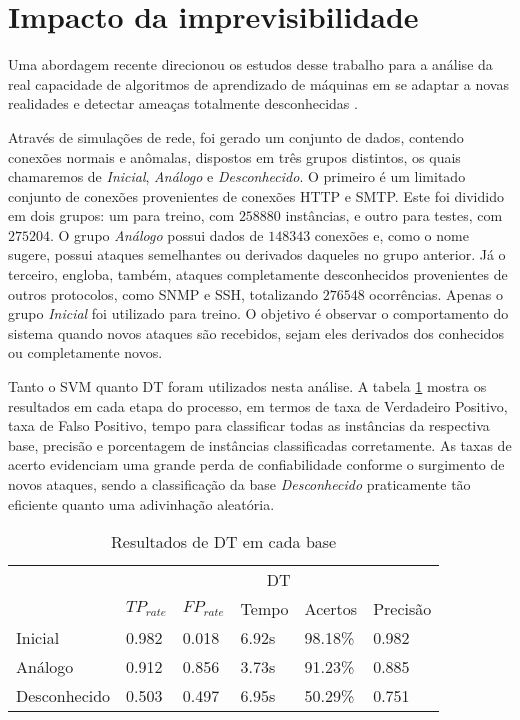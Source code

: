 \section{Impacto da imprevisibilidade}
Uma abordagem recente direcionou os estudos desse trabalho para a análise da real capacidade de algoritmos de
aprendizado de máquinas em se adaptar a novas realidades e detectar ameaças totalmente desconhecidas \cite{sommer10}.
\par Através de simulações de rede, foi gerado um conjunto de dados, contendo conexões normais e anômalas,
dispostos em três grupos distintos, os quais chamaremos de \textit{Inicial}, \textit{Análogo} e \textit{Desconhecido}.
O primeiro é um limitado conjunto de conexões provenientes de conexões HTTP e SMTP. Este foi dividido em dois grupos:
um para treino, com $258880$ instâncias, e outro para testes, com $275204$. O grupo \textit{Análogo} possui dados de
$148343$ conexões e, como o nome sugere, possui ataques semelhantes ou derivados daqueles no grupo anterior.
Já o terceiro, engloba, também, ataques completamente desconhecidos provenientes de outros
protocolos, como SNMP e SSH, totalizando $276548$ ocorrências. Apenas o grupo \textit{Inicial} foi utilizado para
treino. O objetivo é observar o comportamento do sistema quando novos
ataques são recebidos, sejam eles derivados dos conhecidos ou completamente novos.
\par Tanto o SVM quanto DT foram utilizados nesta análise. A tabela \ref{tab:dt} mostra os resultados
em cada etapa do processo, em termos de taxa de Verdadeiro Positivo, taxa de Falso Positivo, tempo para classificar
todas as instâncias da respectiva base, precisão e porcentagem de instâncias classificadas corretamente. As taxas de
acerto evidenciam uma grande perda de confiabilidade conforme o surgimento de novos ataques, sendo a classificação da
base \textit{Desconhecido} praticamente tão eficiente quanto uma adivinhação aleatória.

\begin{table}[h]
    \centering
    \caption{Resultados de DT em cada base}
    \label{tab:dt}
    \begin{tabular}{l|l|l|l|l|l|}
        \cline{2-6}
                                                                   & \multicolumn{5}{c|}{\cellcolor[HTML]{EFEFEF}DT}        \\ \cline{2-6}
                                                                   & $TP_{rate}$ & $FP_{rate}$ & Tempo & Acertos & Precisão \\ \hline
        \multicolumn{1}{|l|}{\cellcolor[HTML]{EFEFEF}Inicial}      & 0.982       & 0.018       & 6.92s & 98.18\% & 0.982    \\ \hline
        \multicolumn{1}{|l|}{\cellcolor[HTML]{EFEFEF}Análogo}      & 0.912       & 0.856       & 3.73s  & 91.23\% & 0.885    \\ \hline
        \multicolumn{1}{|l|}{\cellcolor[HTML]{EFEFEF}Desconhecido} & 0.503       & 0.497       & 6.95s & 50.29\% & 0.751    \\ \hline
    \end{tabular}
\end{table}

